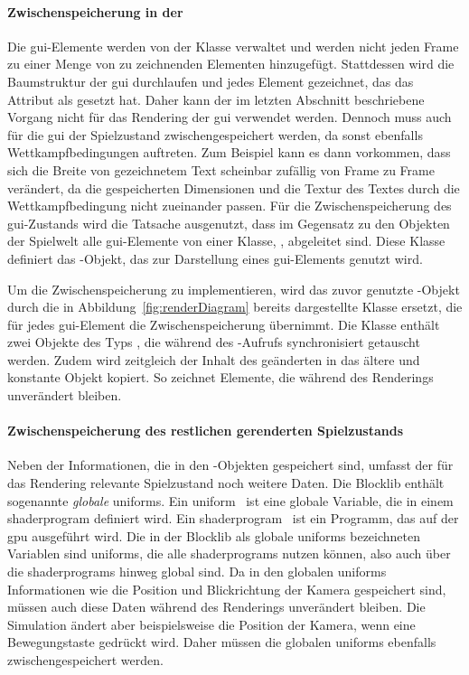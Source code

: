 \paragraph{Zwischenspeicherung in der }
Die \ac{gui}-Elemente werden von der Klasse  verwaltet und werden nicht jeden Frame zu einer Menge von zu zeichnenden Elementen hinzugefügt. 
Stattdessen wird die Baumstruktur der \ac{gui} durchlaufen und jedes Element gezeichnet, das das Attribut  als  gesetzt hat. Daher kann der im letzten Abschnitt beschriebene Vorgang nicht für das Rendering der \ac{gui} verwendet werden. Dennoch muss auch für die \ac{gui} der Spielzustand zwischengespeichert werden, da sonst ebenfalls Wettkampfbedingungen auftreten. Zum Beispiel kann es dann vorkommen, dass sich die Breite von gezeichnetem Text scheinbar zufällig von Frame zu Frame verändert, da die gespeicherten Dimensionen und die Textur des Textes durch die Wettkampfbedingung nicht zueinander passen. Für die Zwischenspeicherung des \ac{gui}-Zustands wird die Tatsache ausgenutzt, dass im Gegensatz zu den Objekten der Spielwelt alle \ac{gui}-Elemente von einer Klasse, , abgeleitet sind. Diese Klasse definiert das -Objekt, das zur Darstellung eines \ac{gui}-Elements genutzt wird. 

Um die Zwischenspeicherung zu implementieren, wird das zuvor genutzte -Objekt durch die in Abbildung~\ref{fig:renderDiagram} bereits dargestellte Klasse  ersetzt, die für jedes \ac{gui}-Element die Zwischenspeicherung übernimmt. Die Klasse enthält zwei Objekte des Typs , die während des -Aufrufs synchronisiert getauscht werden. Zudem wird zeitgleich der Inhalt des geänderten  in das ältere und konstante Objekt kopiert. So zeichnet  Elemente, die während des Renderings unverändert bleiben.

\paragraph{Zwischenspeicherung des restlichen gerenderten Spielzustands} Neben der Informationen, die in den  -Objekten gespeichert sind, umfasst der für das Rendering relevante Spielzustand noch weitere Daten. 
Die Blocklib enthält sogenannte \emph{globale} \glspl{uniform}. Ein \gls{uniform}~\cite[S.~45~ff.]{Vries2020} ist eine globale Variable, die in einem \gls{shaderprogram} definiert wird. Ein \gls{shaderprogram}~\cite[S.~32~f.]{Vries2020} ist ein \gls{Programm}, das auf der \ac{gpu} ausgeführt wird. Die in der Blocklib als globale \glspl{uniform} bezeichneten Variablen sind \glspl{uniform}, die alle \glspl{shaderprogram} nutzen können, also auch über die \glspl{shaderprogram} hinweg global sind. Da in den globalen \glspl{uniform} Informationen wie die Position und Blickrichtung der Kamera gespeichert sind, müssen auch diese Daten während des Renderings unverändert bleiben. Die Simulation ändert aber beispielsweise die Position der Kamera, wenn eine Bewegungstaste gedrückt wird. Daher müssen die globalen \glspl{uniform} ebenfalls zwischengespeichert werden.

